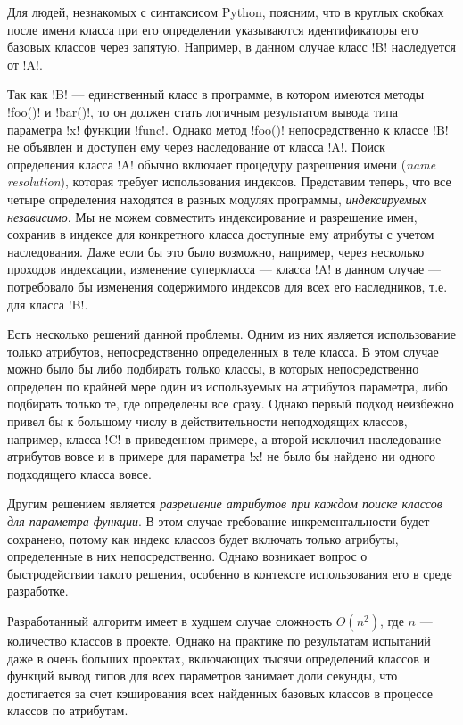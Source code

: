 Для людей, незнакомых с синтаксисом Python, поясним, что в круглых скобках после
имени класса при его определении указываются идентификаторы его базовых классов
через запятую. Например, в данном случае класс !B! наследуется от !A!.

Так как !B! --- единственный класс в программе, в котором имеются методы !foo()! и
!bar()!, то он должен стать логичным результатом вывода типа параметра !x!
функции !func!. Однако метод !foo()! непосредственно к классе !B! не объявлен
и доступен ему через наследование от класса !A!. Поиск определения класса !A!
обычно включает процедуру разрешения имени (\emph{name resolution}), которая
требует использования индексов. Представим теперь, что все четыре
определения находятся в разных модулях программы, \emph{индексируемых
независимо}. Мы не можем совместить индексирование и разрешение имен, сохранив в
индексе для конкретного класса доступные ему атрибуты с учетом наследования.
Даже если бы это было возможно, например, через несколько проходов индексации,
изменение суперкласса --- класса !A! в данном случае --- потребовало бы изменения
содержимого индексов для всех его наследников, т.е. для класса !B!. 

Есть несколько решений данной проблемы. Одним из них является использование
только атрибутов, непосредственно определенных в теле класса. В этом случае
можно было бы либо подбирать только классы, в которых непосредственно определен
по крайней мере один из используемых на атрибутов параметра, либо подбирать
только те, где определены все сразу. Однако первый подход неизбежно привел бы к
большому числу в действительности неподходящих классов, например, класса !C! в
приведенном примере, а второй исключил наследование атрибутов вовсе и в примере
для параметра !x! не было бы найдено ни одного подходящего класса вовсе.

Другим решением является \emph{разрешение атрибутов при каждом поиске классов для
параметра функции}. В этом случае требование инкрементальности будет сохранено,
потому как индекс классов будет включать только атрибуты, определенные в них
непосредственно. Однако возникает вопрос о быстродействии такого решения,
особенно в контексте использования его в среде разработке. 

Разработанный алгоритм имеет в худшем случае сложность $O(n^2)$, где $n$ ---
количество классов в проекте. Однако на практике по результатам испытаний даже в
очень больших проектах, включающих тысячи определений классов и функций вывод
типов для всех параметров занимает доли секунды, что достигается за счет
кэширования всех найденных базовых классов в процессе классов по атрибутам.

